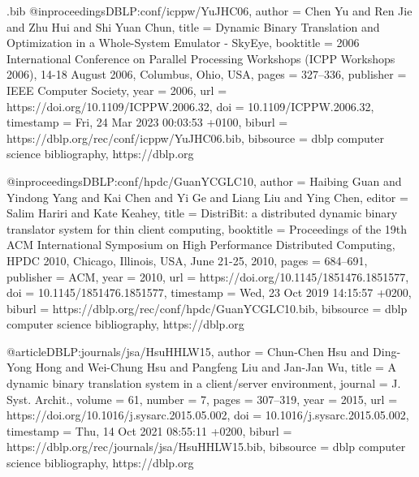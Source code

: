 \begin{filecontents}{\jobname.bib}
@inproceedings{DBLP:conf/icppw/YuJHC06,
  author       = {Chen Yu and
                  Ren Jie and
                  Zhu Hui and
                  Shi Yuan Chun},
  title        = {Dynamic Binary Translation and Optimization in a Whole-System Emulator
                  - SkyEye},
  booktitle    = {2006 International Conference on Parallel Processing Workshops {(ICPP}
                  Workshops 2006), 14-18 August 2006, Columbus, Ohio, {USA}},
  pages        = {327--336},
  publisher    = {{IEEE} Computer Society},
  year         = {2006},
  url          = {https://doi.org/10.1109/ICPPW.2006.32},
  doi          = {10.1109/ICPPW.2006.32},
  timestamp    = {Fri, 24 Mar 2023 00:03:53 +0100},
  biburl       = {https://dblp.org/rec/conf/icppw/YuJHC06.bib},
  bibsource    = {dblp computer science bibliography, https://dblp.org}
}

@inproceedings{DBLP:conf/hpdc/GuanYCGLC10,
  author       = {Haibing Guan and
                  Yindong Yang and
                  Kai Chen and
                  Yi Ge and
                  Liang Liu and
                  Ying Chen},
  editor       = {Salim Hariri and
                  Kate Keahey},
  title        = {DistriBit: a distributed dynamic binary translator system for thin
                  client computing},
  booktitle    = {Proceedings of the 19th {ACM} International Symposium on High Performance
                  Distributed Computing, {HPDC} 2010, Chicago, Illinois, USA, June 21-25,
                  2010},
  pages        = {684--691},
  publisher    = {{ACM}},
  year         = {2010},
  url          = {https://doi.org/10.1145/1851476.1851577},
  doi          = {10.1145/1851476.1851577},
  timestamp    = {Wed, 23 Oct 2019 14:15:57 +0200},
  biburl       = {https://dblp.org/rec/conf/hpdc/GuanYCGLC10.bib},
  bibsource    = {dblp computer science bibliography, https://dblp.org}
}

@article{DBLP:journals/jsa/HsuHHLW15,
  author       = {Chun{-}Chen Hsu and
                  Ding{-}Yong Hong and
                  Wei{-}Chung Hsu and
                  Pangfeng Liu and
                  Jan{-}Jan Wu},
  title        = {A dynamic binary translation system in a client/server environment},
  journal      = {J. Syst. Archit.},
  volume       = {61},
  number       = {7},
  pages        = {307--319},
  year         = {2015},
  url          = {https://doi.org/10.1016/j.sysarc.2015.05.002},
  doi          = {10.1016/j.sysarc.2015.05.002},
  timestamp    = {Thu, 14 Oct 2021 08:55:11 +0200},
  biburl       = {https://dblp.org/rec/journals/jsa/HsuHHLW15.bib},
  bibsource    = {dblp computer science bibliography, https://dblp.org}
}


\end{filecontents}
